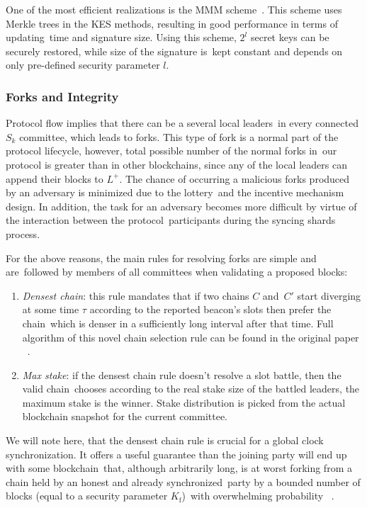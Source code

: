 One of the most efficient realizations is the MMM scheme~\cite{Malkin2002}.
This scheme uses Merkle trees in the KES methods, resulting in good performance in terms of updating\
time and signature size.
Using this scheme, $2^l$ secret keys can be securely restored, while size of the signature is\
kept constant and depends on only pre-defined security parameter $l$.

\subsubsection{Forks and Integrity}\label{subsubsec:resolving-forks}

Protocol flow implies that there can be a several local leaders\
in every connected $S_k$ committee, which leads to forks.
This type of fork is a normal part of the protocol lifecycle, however, total possible number of the normal forks in\
our protocol is greater than in other blockchains, since any of the local leaders can append their blocks to $L^+$.
The chance of occurring a malicious forks produced by an adversary is minimized due to the lottery\
and the incentive mechanism design.
In addition, the task for an adversary becomes more difficult by virtue of the interaction between the protocol\
participants during the syncing shards process.

For the above reasons, the main rules for resolving forks are simple and are\
followed by members of all committees when validating a proposed blocks:
\begin{enumerate}
    \item \textit{Densest chain}: this rule mandates that if two chains $C$ and\
    $C'$ start diverging at some time $\tau$ according to the reported beacon's slots then prefer the chain\
    which is denser in a suﬃciently long interval after that time.
    Full algorithm of this novel chain selection rule can be found in the original paper ~\cite{Badertscher2018}.
    \item \textit{Max stake}: if the densest chain rule doesn't resolve a slot battle, then the valid chain\
    chooses according to the real stake size of the battled leaders, the maximum stake is the winner.
    Stake distribution is picked from the actual blockchain snapshot for the current committee.
\end{enumerate}
We will note here, that the densest chain rule is crucial for a global clock synchronization.
It offers a useful guarantee than the joining party will end up with some blockchain\
that, although arbitrarily long, is at worst forking from a chain held by an honest and already synchronized\
party by a bounded number of blocks (equal to a security parameter $K_{\text{f}}$)\
with overwhelming probability ~\cite{cryptoeprint:2019/838}.

